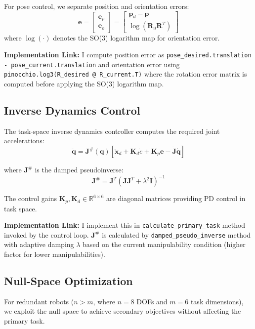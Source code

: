 \documentclass[journal,10pt,twocolumn]{IEEEtran}
\begin{document}
For pose control, we separate position and orientation errors:
\begin{equation}
\mathbf{e} = \begin{bmatrix} \mathbf{e}_p \\ \mathbf{e}_o \end{bmatrix} = \begin{bmatrix} \mathbf{p}_d - \mathbf{p} \\ \log(\mathbf{R}_d\mathbf{R}^T) \end{bmatrix}
\end{equation}
where $\log(\cdot)$ denotes the SO(3) logarithm map for orientation error.

\textbf{Implementation Link:} I compute position error as \texttt{pose\_desired.translation - pose\_current.translation} and orientation error using \texttt{pinocchio.log3(R\_desired @ R\_current.T)} where the rotation error matrix is computed before applying the SO(3) logarithm map.

\subsection{Inverse Dynamics Control}
The task-space inverse dynamics controller computes the required joint accelerations:
\begin{equation}
\ddot{\mathbf{q}} = \mathbf{J}^\#(\mathbf{q})\left[\ddot{\mathbf{x}}_d + \mathbf{K}_d\dot{e} + \mathbf{K}_p\mathbf{e} - \dot{\mathbf{J}}\dot{\mathbf{q}}\right]
\end{equation}

where $\mathbf{J}^\#$ is the damped pseudoinverse:
\begin{equation}
\mathbf{J}^\# = \mathbf{J}^T(\mathbf{J}\mathbf{J}^T + \lambda^2\mathbf{I})^{-1}
\end{equation}

The control gains $\mathbf{K}_p, \mathbf{K}_d \in \mathbb{R}^{6 \times 6}$ are diagonal matrices providing PD control in task space.

\textbf{Implementation Link:} I implement this in \texttt{calculate\_primary\_task} method invoked by the control loop. $\mathbf{J}^\#$ is calculated by \texttt{damped\_pseudo\_inverse} method with adaptive damping $\lambda$ based on the current manipulability condition (higher factor for lower manipulabilities).

\subsection{Null-Space Optimization}
For redundant robots ($n > m$, where $n=8$ DOFs and $m=6$ task dimensions), we exploit the null space to achieve secondary objectives without affecting the primary task.
\end{document}
